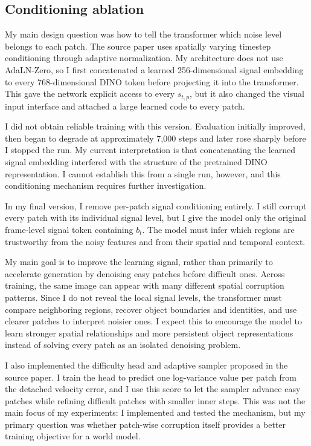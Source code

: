 \documentclass[10pt,a4paper]{article}
\begin{document}
\subsection{Conditioning ablation}

My main design question was how to tell the transformer which noise level belongs to each patch. The source paper uses spatially varying timestep conditioning through adaptive normalization. My architecture does not use AdaLN-Zero, so I first concatenated a learned 256-dimensional signal embedding to every 768-dimensional DINO token before projecting it into the transformer. This gave the network explicit access to every $s_{t,p}$, but it also changed the visual input interface and attached a large learned code to every patch.

I did not obtain reliable training with this version. Evaluation initially improved, then began to degrade at approximately 7,000 steps and later rose sharply before I stopped the run. My current interpretation is that concatenating the learned signal embedding interfered with the structure of the pretrained DINO representation. I cannot establish this from a single run, however, and this conditioning mechanism requires further investigation.

In my final version, I remove per-patch signal conditioning entirely. I still corrupt every patch with its individual signal level, but I give the model only the original frame-level signal token containing $b_t$. The model must infer which regions are trustworthy from the noisy features and from their spatial and temporal context.

My main goal is to improve the learning signal, rather than primarily to accelerate generation by denoising easy patches before difficult ones. Across training, the same image can appear with many different spatial corruption patterns. Since I do not reveal the local signal levels, the transformer must compare neighboring regions, recover object boundaries and identities, and use clearer patches to interpret noisier ones. I expect this to encourage the model to learn stronger spatial relationships and more persistent object representations instead of solving every patch as an isolated denoising problem.

I also implemented the difficulty head and adaptive sampler proposed in the source paper. I train the head to predict one log-variance value per patch from the detached velocity error, and I use this score to let the sampler advance easy patches while refining difficult patches with smaller inner steps. This was not the main focus of my experiments: I implemented and tested the mechanism, but my primary question was whether patch-wise corruption itself provides a better training objective for a world model.
\end{document}
